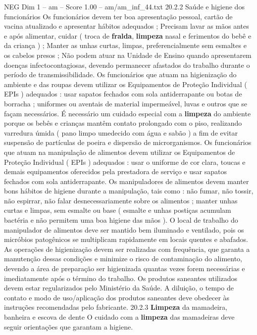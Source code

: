 \begin{textsample}{NEG Dim 1 – am – Score 1.00 – am/am\_inf\_44.txt}  \label{ex:f1_neg_063}
20.2.2 Saúde e higiene dos funcionários Os funcionários devem ter boa apresentação pessoal, cartão de vacina atualizado e apresentar hábitos adequados ; Precisam lavar as mãos antes e após alimentar, cuidar ( troca de \textbf{fralda}, \textbf{limpeza} nasal e ferimentos do bebê e da criança ) ; Manter as unhas curtas, limpas, preferencialmente sem esmaltes e os cabelos presos ; Não podem atuar na Unidade de Ensino quando apresentarem doenças infectocontagiosas, devendo permanecer afastados do trabalho durante o período de transmissibilidade.
Os funcionários que atuam na higienização do ambiente e das roupas devem utilizar os Equipamentos de Proteção Individual ( EPIs ) adequados : usar sapatos fechados com sola antiderrapante ou botas de borracha ; uniformes ou aventais de material impermeável, luvas e outros que se façam necessários.
É necessário um cuidado especial com a \textbf{limpeza} do ambiente porque os bebês e crianças mantêm contato prolongado com o piso, realizando varredura úmida ( pano limpo umedecido com água e sabão ) a fim de evitar suspensão de partículas de poeira e dispersão de microrganismos.
Os funcionários que atuam na manipulação de alimentos devem utilizar os Equipamentos de Proteção Individual ( EPIs ) adequados : usar o uniforme de cor clara, toucas e demais equipamentos oferecidos pela prestadora de serviço e usar sapatos fechados com sola antiderrapante.
Os manipuladores de alimentos devem manter bons hábitos de higiene durante a manipulação, tais como : não fumar, não tossir, não espirrar, não falar desnecessariamente sobre os alimentos ; manter unhas curtas e limpas, sem esmalte ou base ( esmalte e unhas postiças acumulam bactéria e não permitem uma boa higiene das mãos ).
O local de trabalho do manipulador de alimentos deve ser mantido bem iluminado e ventilado, pois os micróbios patogênicos se multiplicam rapidamente em locais quentes e abafados.
As operações de higienização devem ser realizadas com frequência, que garanta a manutenção dessas condições e minimize o risco de contaminação do alimento, devendo a área de preparação ser higienizada quantas vezes forem necessárias e imediatamente após o término do trabalho.
Os produtos saneantes utilizados devem estar regularizados pelo Ministério da Saúde.
A diluição, o tempo de contato e modo de uso/aplicação dos produtos saneantes deve obedecer às instruções recomendadas pelo fabricante. 20.2.3 \textbf{Limpeza} da mamadeira, banheira e escova de dente O cuidado com a \textbf{limpeza} das mamadeiras deve seguir orientações que garantam a higiene.

\end{textsample}
